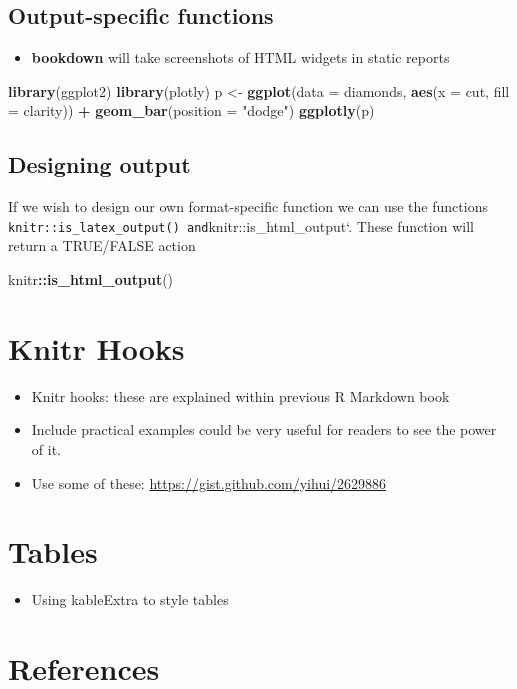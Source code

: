 \documentclass[]{book}
\newenvironment{Shaded}{\begin{snugshade}}{\end{snugshade}}
\newcommand{\KeywordTok}[1]{\textcolor[rgb]{0.13,0.29,0.53}{\textbf{#1}}}
\newcommand{\DataTypeTok}[1]{\textcolor[rgb]{0.13,0.29,0.53}{#1}}
\newcommand{\StringTok}[1]{\textcolor[rgb]{0.31,0.60,0.02}{#1}}
\newcommand{\OperatorTok}[1]{\textcolor[rgb]{0.81,0.36,0.00}{\textbf{#1}}}
\newcommand{\NormalTok}[1]{#1}
\providecommand{\tightlist}{%
  \setlength{\itemsep}{0pt}\setlength{\parskip}{0pt}}
\theoremstyle{definition}
\theoremstyle{definition}
\theoremstyle{definition}
\theoremstyle{remark}
\begin{document}
\section{Output-specific functions}\label{output-specific-functions}

\begin{itemize}
\tightlist
\item
  \textbf{bookdown} will take screenshots of HTML widgets in static
  reports
\end{itemize}

\begin{Shaded}
\begin{Highlighting}[]
\KeywordTok{library}\NormalTok{(ggplot2)}
\KeywordTok{library}\NormalTok{(plotly)}
\NormalTok{p <-}\StringTok{ }\KeywordTok{ggplot}\NormalTok{(}\DataTypeTok{data =}\NormalTok{ diamonds, }\KeywordTok{aes}\NormalTok{(}\DataTypeTok{x =}\NormalTok{ cut, }\DataTypeTok{fill =}\NormalTok{ clarity)) }\OperatorTok{+}
\StringTok{            }\KeywordTok{geom_bar}\NormalTok{(}\DataTypeTok{position =} \StringTok{"dodge"}\NormalTok{)}
\KeywordTok{ggplotly}\NormalTok{(p)}
\end{Highlighting}
\end{Shaded}

\section{Designing output}\label{designing-output}

If we wish to design our own format-specific function we can use the
functions
\texttt{knitr::is\_latex\_output()\ and}knitr::is\_html\_output`. These
function will return a TRUE/FALSE action

\begin{Shaded}
\begin{Highlighting}[]
\NormalTok{knitr}\OperatorTok{::}\KeywordTok{is_html_output}\NormalTok{()}
\end{Highlighting}
\end{Shaded}

\chapter{Knitr Hooks}\label{knitr-hooks}

\begin{itemize}
\tightlist
\item
  Knitr hooks: these are explained within previous R Markdown book
\item
  Include practical examples could be very useful for readers to see the
  power of it.
\item
  Use some of these: \url{https://gist.github.com/yihui/2629886}
\end{itemize}

\chapter{Tables}\label{tables}

\begin{itemize}
\tightlist
\item
  Using kableExtra to style tables
\end{itemize}

\chapter{References}\label{references}


\end{document}
